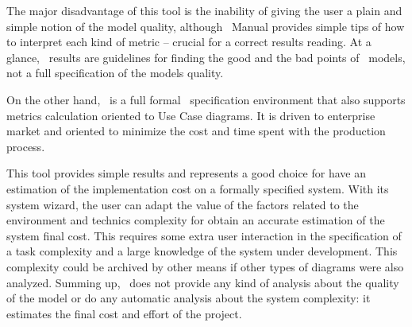 The major disadvantage of this tool is the inability of giving the user a plain and simple notion of the model quality, although \sdmetrics\ Manual provides simple tips of how to interpret each kind of metric -- crucial for a correct results reading.
At a glance, \sdmetrics\ results are guidelines for finding the good and the bad points of  \uml\ models, not a full specification of the models quality. 

On the other hand, \entArch\ is a full formal \uml\ specification environment that also supports metrics calculation oriented to Use Case diagrams. 
It is driven to enterprise market and oriented to minimize the cost and time spent with the production process.

This tool provides simple results and represents a good choice for have an estimation of the implementation cost on a formally specified system. 
With its system wizard, the user can adapt the value of the factors related to the environment and technics complexity for obtain an accurate estimation of the system final cost.
This requires some extra user interaction in the specification of a task complexity and a large knowledge of the system under development.
This complexity could be archived by other means if other types of diagrams were also analyzed.
Summing up, \entArch\  does not provide any kind of analysis about the quality of the model or do any automatic analysis about the system complexity: it estimates the final cost and effort of the project.

\begin{comment}
We consider this a valid approach, but it requires some extra user interaction in the specification of the complexity of a task.
This complexity could be archived by other means if other types of diagrams were also analyzed.
The final results presented are simple and also oriented to the final cost, but if the complexity has been specified with knowledge of the environment, they could estimate very well the final cost of the implemented system.

Summing up, in metrics evaluation, this tool is a good choice to have an estimation of the implementation cost on a formally specified system, but this is its only goal, it cannot provide any kind of analysis about the quality of specification or do any automatic analysis about the system complexity.
\end{comment}

